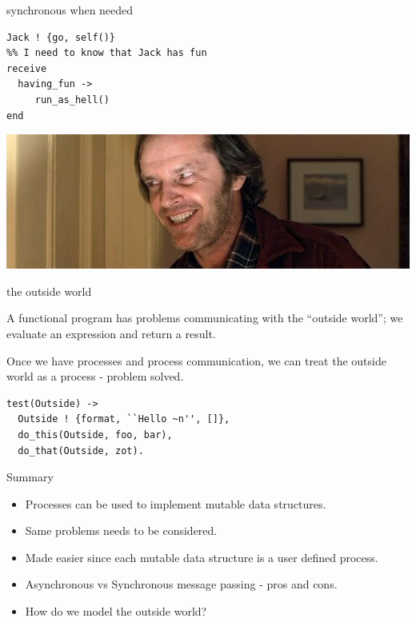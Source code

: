 \begin{frame}[fragile]{synchronous when needed}
\begin{verbatim}
Jack ! {go, self()}
%% I need to know that Jack has fun
receive 
  having_fun ->
     run_as_hell()
end
\end{verbatim}
\pause
\includegraphics[height=0.3\textheight]{fun.jpg}
\end{frame}

\begin{frame}[fragile]{the outside world}

A functional program has problems communicating with the ``outside
world''; we evaluate an expression and return a result.

\pause\vspace{20pt}

Once we have processes and process communication, we can treat the
outside world as a process - problem solved.

\pause\vspace{20pt}

\begin{verbatim}
test(Outside) -> 
  Outside ! {format, ``Hello ~n'', []},
  do_this(Outside, foo, bar),
  do_that(Outside, zot).
\end{verbatim}

\end{frame}

\begin{frame}{Summary}

\begin{itemize}
\item Processes can be used to implement mutable data structures.
\item Same problems needs to be considered. 
\item Made easier since each mutable data structure is a user defined process.
\item Asynchronous vs Synchronous message passing - pros and cons.
\item How do we model the outside world?
\end{itemize}

\end{frame}

